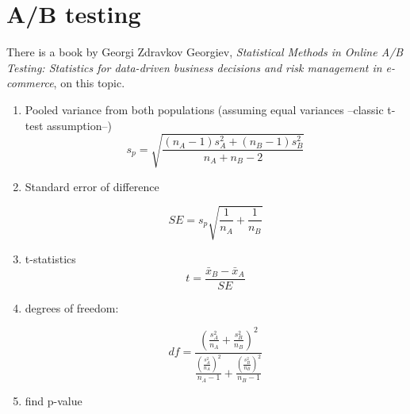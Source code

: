 \section{A/B testing}
There is a book by Georgi Zdravkov Georgiev, \emph{Statistical Methods in Online A/B Testing: Statistics for data-driven business decisions and risk management in e-commerce}, on this topic.


\begin{enumerate}
\item Pooled variance from both populations (assuming equal variances --classic t-test assumption--)
\[ s_p = \sqrt{\frac{(n_A - 1)s_A^2 + (n_B - 1)s_B^2}{n_A + n_B - 2}}\]

\item Standard error of difference

\[SE = s_p \sqrt{\frac{1}{n_A} + \frac{1}{n_B}}\]

\item t-statistics
\[t = \frac{\bar{x}_B - \bar{x}_A}{SE}\]

\item degrees of freedom:

\[
df = \frac{
\left( \frac{s_A^2}{n_A} + \frac{s_B^2}{n_B} \right)^2
}{
\frac{
\left(\frac{s_A^2}{n_A}\right)^2}{n_A - 1}
+
\frac{
\left(\frac{s_B^2}{n_B}\right)^2}{n_B - 1}
}
\]

\item find p-value

\end{enumerate}

